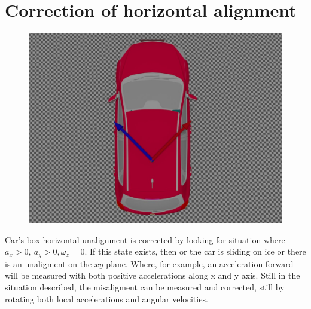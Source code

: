 \section{Correction of horizontal alignment}
\begin{figure}[H]
\includegraphics[width=\textwidth]{kia_bad_xy_align.jpg}
\end{figure}
Car's box horizontal unalignment is corrected by looking for situation where $a_x>0, \ a_y>0, \omega_z =0$. If this state exists, then or the car is sliding on ice or there is an unaligment on the $xy$ plane. Where, for example, an acceleration forward will be measured with both positive accelerations along x and y axis. 
Still in the situation described, the misaligment can be measured and corrected, still by rotating both local accelerations and angular velocities.

